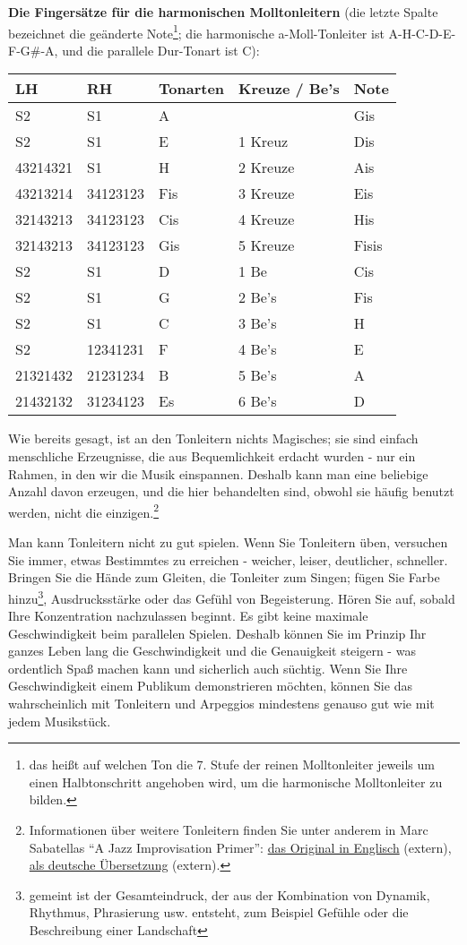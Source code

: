 \textbf{Die Fingersätze für die harmonischen Molltonleitern} (die letzte Spalte bezeichnet die geänderte Note\footnote{das heißt auf welchen Ton die 7. Stufe der reinen Molltonleiter jeweils um einen Halbtonschritt angehoben wird, um die harmonische Molltonleiter zu bilden.}; die harmonische a-Moll-Tonleiter ist A-H-C-D-E-F-G\#-A, und die parallele Dur-Tonart ist C):

\begin{tabular}{l|l|l|l|l}
 \textbf{LH} & \textbf{RH} & \textbf{Tonarten} & \textbf{Kreuze / Be's} & \textbf{Note} \\
 \hline
 S2 & S1 & A &   & Gis \\
 S2 & S1 & E & 1 Kreuz & Dis \\ 
 43214321 & S1 & H & 2 Kreuze & Ais \\ 
 43213214 & 34123123 & Fis & 3 Kreuze & Eis \\ 
 32143213 & 34123123 & Cis & 4 Kreuze & His \\ 
 32143213 & 34123123 & Gis & 5 Kreuze & Fisis \\ 
 S2 & S1 & D & 1 Be & Cis \\
 S2 & S1 & G & 2 Be's & Fis \\ 
 S2 & S1 & C & 3 Be's & H \\ 
 S2 & 12341231 & F & 4 Be's & E \\ 
 21321432 & 21231234 & B & 5 Be's & A \\ 
 21432132 & 31234123 & Es & 6 Be's & D \\ 
\end{tabular}

Wie bereits gesagt, ist an den Tonleitern nichts Magisches; sie sind einfach menschliche Erzeugnisse, die aus Bequemlichkeit erdacht wurden - nur ein Rahmen, in den wir die Musik einspannen.
Deshalb kann man eine beliebige Anzahl davon erzeugen, und die hier behandelten sind, obwohl sie häufig benutzt werden, nicht die einzigen.\footnote{Informationen über weitere Tonleitern finden Sie unter anderem in Marc Sabatellas \enquote{A Jazz Improvisation Primer}: \hyperref[http://www.outsideshore.com/primer/primer/index.html]{das Original in Englisch} (extern), \hyperref[http://msjipde.uteedgar-lins.de/index.html]{als deutsche Übersetzung} (extern).}

Man kann Tonleitern nicht zu gut spielen.
Wenn Sie Tonleitern üben, versuchen Sie immer, etwas Bestimmtes zu erreichen - weicher, leiser, deutlicher, schneller.
Bringen Sie die Hände zum Gleiten, die Tonleiter zum Singen; fügen Sie Farbe hinzu\footnote{gemeint ist der Gesamteindruck, der aus der Kombination von Dynamik, Rhythmus, Phrasierung usw. entsteht, zum Beispiel Gefühle oder die Beschreibung einer Landschaft}, Ausdrucksstärke oder das Gefühl von  Begeisterung.
Hören Sie auf, sobald Ihre Konzentration nachzulassen beginnt.
Es gibt keine maximale Geschwindigkeit beim parallelen Spielen.
Deshalb können Sie im Prinzip Ihr ganzes Leben lang die Geschwindigkeit und die Genauigkeit steigern - was ordentlich Spaß machen kann und sicherlich auch süchtig.
Wenn Sie Ihre Geschwindigkeit einem Publikum demonstrieren möchten, können Sie das wahrscheinlich mit Tonleitern und Arpeggios mindestens genauso gut wie mit jedem Musikstück.



